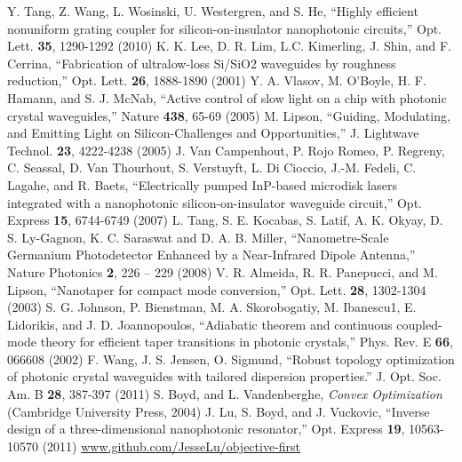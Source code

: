 \documentclass[letterpaper,10pt]{article}
\begin{document}
\begin{thebibliography}{99}
 Y. Tang, Z. Wang, L. Wosinski, U. Westergren, and S. He,
    ``Highly efficient nonuniform grating coupler for silicon-on-insulator 
    nanophotonic circuits,''
    Opt. Lett. \textbf{35}, 1290-1292 (2010)
  K. K. Lee, D. R. Lim, L.C. Kimerling, J. Shin, and F. Cerrina, 
    ``Fabrication of ultralow-loss Si/SiO2 waveguides by roughness reduction,''
    Opt. Lett. \textbf{26}, 1888-1890 (2001)
 Y. A. Vlasov, M. O'Boyle, H. F. Hamann, and S. J. McNab,
    ``Active control of slow light on a chip with photonic crystal waveguides,''
    Nature \textbf{438}, 65-69 (2005)
 M. Lipson, 
    ``Guiding, Modulating, and Emitting Light on 
    Silicon-Challenges and Opportunities,'' 
    J. Lightwave Technol. \textbf{23}, 4222-4238 (2005) 
 J. Van Campenhout, P. Rojo Romeo, P. Regreny, C. Seassal, 
    D. Van Thourhout, S. Verstuyft, L. Di Cioccio, J.-M. Fedeli, 
    C. Lagahe, and R. Baets, 
    ``Electrically pumped InP-based microdisk lasers integrated with a 
    nanophotonic silicon-on-insulator waveguide circuit,'' 
    Opt. Express \textbf{15}, 6744-6749 (2007) 
 L. Tang, S. E. Kocabas, S. Latif, A. K. Okyay, 
    D. S. Ly-Gagnon, K. C. Saraswat and D. A. B. Miller, 
    ``Nanometre-Scale Germanium Photodetector Enhanced by a 
    Near-Infrared Dipole Antenna,'' 
    Nature Photonics \textbf{2}, 226 – 229 (2008) 
 V. R. Almeida, R. R. Panepucci, and M. Lipson, 
    ``Nanotaper for compact mode conversion,'' 
    Opt. Lett. \textbf{28}, 1302-1304 (2003) 
 S. G. Johnson, P. Bienstman,  M. A. Skorobogatiy, 
    M. Ibanescu1, E. Lidorikis, and J. D. Joannopoulos,
    ``Adiabatic theorem and continuous coupled-mode theory for 
    efficient taper transitions in photonic crystals,''
    Phys. Rev. E \textbf{66}, 066608 (2002)
 F. Wang, J. S. Jensen, O. Sigmund, 
    ``Robust topology optimization of photonic crystal waveguides with 
    tailored dispersion properties.'' 
    J. Opt. Soc. Am. B \textbf{28}, 387-397 (2011)
 S. Boyd, and L. Vandenberghe, 
    \emph{Convex Optimization} 
    (Cambridge University Press, 2004)
 J. Lu, S. Boyd, and J. Vuckovic, 
    ``Inverse design of a three-dimensional nanophotonic resonator,''
    Opt. Express \textbf{19}, 10563-10570 (2011) 
 \url{www.github.com/JesseLu/objective-first}
\end{thebibliography}
\end{document}
